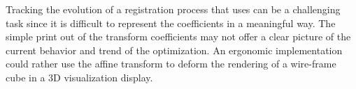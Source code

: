Tracking the evolution of a registration process that uses
 can be a challenging task since it is difficult to
represent the coefficients in a meaningful way.  The simple print out of the
transform coefficients may not offer a clear picture of the current behavior
and trend of the optimization.  An ergonomic implementation could rather use
the affine transform to deform the rendering of a wire-frame cube in a 3D
visualization display.


